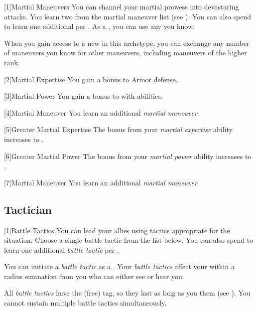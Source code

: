         [1]{Martial Maneuvers}
        You can channel your martial prowess into devastating attacks.
        You learn two  from the martial maneuver list (see ).
        You can also spend  to learn one additional  per .
        As a , you can use any  you know.

        When you gain access to a new  in this archetype,
            you can exchange any number of maneuvers you know for other maneuvers,
            including maneuvers of the higher rank.

        [2]{Martial Expertise} You gain a  bonus to Armor defense.

        [3]{Martial Power} You gain a  bonus to  with  abilities.

        [4]{Martial Maneuver}
        You learn an additional \textit{martial maneuver}.

        [5]{Greater Martial Expertise} The bonus from your \textit{martial expertise} ability increases to .

        [6]{Greater Martial Power} The bonus from your \textit{martial power} ability increases to .

        [7]{Martial Maneuver}
        You learn an additional \textit{martial maneuver}.

    \subsection{Tactician}

        [1]{Battle Tactics}
        You can lead your allies using tactics appropriate for the situation.
        Choose a single battle tactic from the list below.
        You can also spend  to learn one additional \textit{battle tactic} per .

        You can initiate a \textit{battle tactic} as a .
        Your \textit{battle tactics} affect your  within a \arealarge radius emanation from you who can either see or hear you.

        All \textit{battle tactics} have the  (free) tag, so they last as long as you  them (see ).
        You cannot sustain multiple battle tactics simultaneously.

